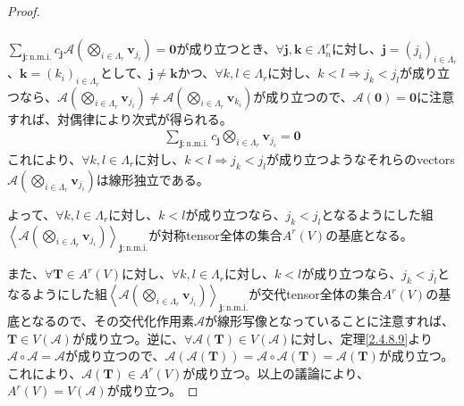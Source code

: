 \documentclass[dvipdfmx]{jsarticle}
\begin{document}
\begin{proof}
\begin{align*}
\end{align*}\par
$\sum_{\mathbf{j}:\mathrm{n.m.i.} } {c_{\mathbf{j}}\mathcal{A}\left( \bigotimes_{i \in \varLambda_{r}} \mathbf{v}_{j_{i}} \right)} = \mathbf{0}$が成り立つとき、$\forall\mathbf{j},\mathbf{k} \in \varLambda_{n}^{r}$に対し、$\mathbf{j}=\left( j_i \right)_{i\in \varLambda_r }$、$\mathbf{k}=\left( k_i \right)_{i\in \varLambda_r }$として、$\mathbf{j} \neq \mathbf{k}$かつ、$\forall k,l \in \varLambda_{r}$に対し、$k < l \Rightarrow j_{k} < j_{l}$が成り立つなら、$\mathcal{A}\left( \bigotimes_{i \in \varLambda_{r}} \mathbf{v}_{j_{i}} \right)\mathcal{\neq A}\left( \bigotimes_{i \in \varLambda_{r}} \mathbf{v}_{k_{i}} \right)$が成り立つので、$\mathcal{A}\left( \mathbf{0} \right) = \mathbf{0}$に注意すれば、対偶律により次式が得られる。
\begin{align*}
\sum_{\mathbf{j}:\mathrm{n.m.i.} } {c_{\mathbf{j}}\bigotimes_{i \in \varLambda_{r}} \mathbf{v}_{j_{i}}} = \mathbf{0}
\end{align*}
これにより、$\forall k,l \in \varLambda_{r}$に対し、$k < l \Rightarrow j_{k} < j_{l}$が成り立つようなそれらのvectors$\mathcal{A}\left( \bigotimes_{i \in \varLambda_{r}} \mathbf{v}_{j_{i}} \right)$は線形独立である。\par
よって、$\forall k,l \in \varLambda_{r}$に対し、$k < l$が成り立つなら、$j_{k} < j_{l}$となるようにした組$\left\langle \mathcal{A}\left( \bigotimes_{i \in \varLambda_{r}} \mathbf{v}_{j_{i}} \right) \right\rangle_{\mathbf{j}:\mathrm{n.m.i.} }$が対称tensor全体の集合$A^{r}(V)$の基底となる。\par
また、$\forall\mathbf{T} \in A^{r}(V)$に対し、$\forall k,l \in \varLambda_{r}$に対し、$k < l$が成り立つなら、$j_{k} < j_{l}$となるようにした組$\left\langle \mathcal{A}\left( \bigotimes_{i \in \varLambda_{r}} \mathbf{v}_{j_{i}} \right) \right\rangle_{\mathbf{j}:\mathrm{n.m.i.} }$が交代tensor全体の集合$A^{r}(V)$の基底となるので、その交代化作用素$\mathcal{A}$が線形写像となっていることに注意すれば、$\mathbf{T} \in V\left( \mathcal{A} \right)$が成り立つ。逆に、$\mathcal{\forall A}\left( \mathbf{T} \right) \in V\left( \mathcal{A} \right)$に対し、定理\ref{2.4.8.9}より$\mathcal{A \circ A = A}$が成り立つので、$\mathcal{A}\left( \mathcal{A}\left( \mathbf{T} \right) \right) = \mathcal{A \circ A}\left( \mathbf{T} \right) = \mathcal{A}\left( \mathbf{T} \right)$が成り立つ。これにより、$\mathcal{A}\left( \mathbf{T} \right) \in A^{r}(V)$が成り立つ。以上の議論により、$A^{r}(V) = V\left( \mathcal{A} \right)$が成り立つ。\par

\end{proof}
\end{document}
